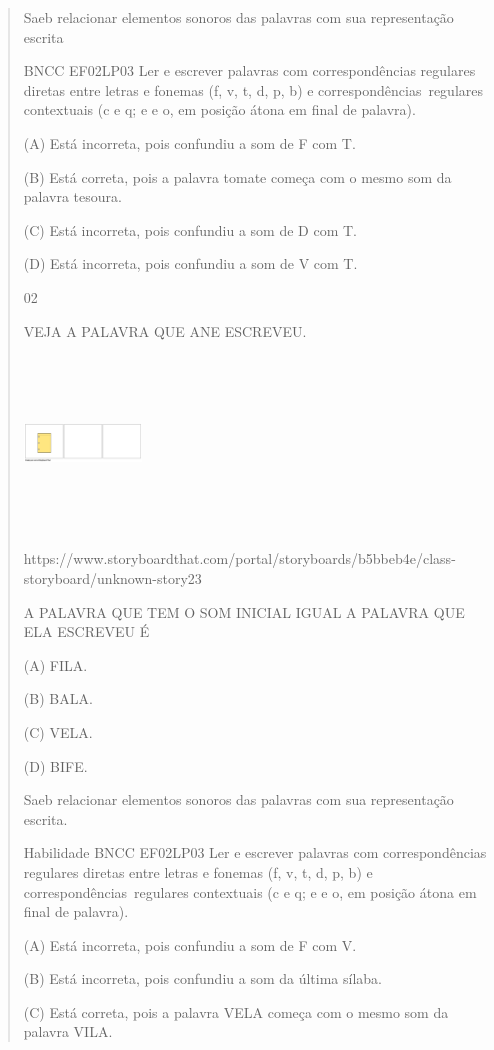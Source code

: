 {{{{\begin{verse}
{{\begin{escolha}
{{{{{Saeb relacionar elementos sonoros das palavras com sua representação
escrita

BNCC EF02LP03 Ler e escrever palavras com correspondências regulares
diretas entre letras e fonemas (f, v, t, d, p, b) e
correspondências~regulares contextuais (c e q; e e o, em posição átona
em final de palavra).

(A) Está incorreta, pois confundiu a som de F com T.

(B) Está correta, pois a palavra tomate começa com o mesmo som da
palavra tesoura.

(C) Está incorreta, pois confundiu a som de D com T.

(D) Está incorreta, pois confundiu a som de V com T.

\num{02}

VEJA A PALAVRA QUE ANE ESCREVEU.

\includegraphics[width=1.22986in,height=1.82986in]{media/image164.png}

https://www.storyboardthat.com/portal/storyboards/b5bbeb4e/class-storyboard/unknown-story23

A PALAVRA QUE TEM O SOM INICIAL IGUAL A PALAVRA QUE ELA ESCREVEU É

(A) FILA.

(B) BALA.

(C) VELA.

(D) BIFE.

Saeb relacionar elementos sonoros das palavras com sua representação
escrita.

Habilidade BNCC EF02LP03 Ler e escrever palavras com correspondências
regulares diretas entre letras e fonemas (f, v, t, d, p, b) e
correspondências~regulares contextuais (c e q; e e o, em posição átona
em final de palavra).

(A) Está incorreta, pois confundiu a som de F com V.

(B) Está incorreta, pois confundiu a som da última sílaba.

(C) Está correta, pois a palavra VELA começa com o mesmo som da palavra
VILA.

}}}}}
\end{escolha}}}
\end{verse}}}}}
